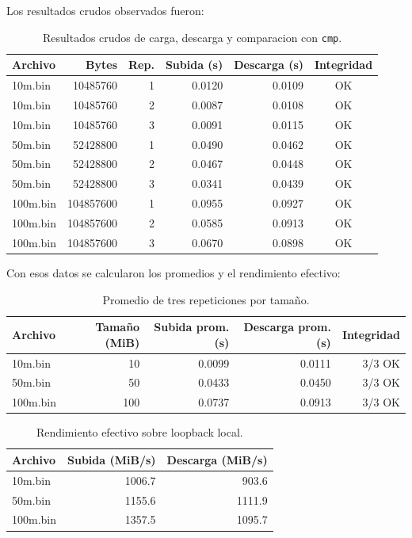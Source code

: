 \documentclass[12pt,letterpaper]{article}
\begin{document}
Los resultados crudos observados fueron:

\begin{table}[H]
\centering
\small
\begin{tabular}{lrrrrc}
\toprule
Archivo & Bytes & Rep. & Subida (s) & Descarga (s) & Integridad \\
\midrule
10m.bin & 10485760 & 1 & 0.0120 & 0.0109 & OK \\
10m.bin & 10485760 & 2 & 0.0087 & 0.0108 & OK \\
10m.bin & 10485760 & 3 & 0.0091 & 0.0115 & OK \\
50m.bin & 52428800 & 1 & 0.0490 & 0.0462 & OK \\
50m.bin & 52428800 & 2 & 0.0467 & 0.0448 & OK \\
50m.bin & 52428800 & 3 & 0.0341 & 0.0439 & OK \\
100m.bin & 104857600 & 1 & 0.0955 & 0.0927 & OK \\
100m.bin & 104857600 & 2 & 0.0585 & 0.0913 & OK \\
100m.bin & 104857600 & 3 & 0.0670 & 0.0898 & OK \\
\bottomrule
\end{tabular}
\caption{Resultados crudos de carga, descarga y comparacion con \texttt{cmp}.}
\end{table}

Con esos datos se calcularon los promedios y el rendimiento efectivo:

\begin{table}[H]
\centering
\begin{tabular}{lrrrr}
\toprule
Archivo & Tama\~{n}o (MiB) & Subida prom. (s) & Descarga prom. (s) & Integridad \\
\midrule
10m.bin & 10 & 0.0099 & 0.0111 & 3/3 OK \\
50m.bin & 50 & 0.0433 & 0.0450 & 3/3 OK \\
100m.bin & 100 & 0.0737 & 0.0913 & 3/3 OK \\
\bottomrule
\end{tabular}
\caption{Promedio de tres repeticiones por tama\~{n}o.}
\end{table}

\begin{table}[H]
\centering
\begin{tabular}{lrr}
\toprule
Archivo & Subida (MiB/s) & Descarga (MiB/s) \\
\midrule
10m.bin & 1006.7 & 903.6 \\
50m.bin & 1155.6 & 1111.9 \\
100m.bin & 1357.5 & 1095.7 \\
\bottomrule
\end{tabular}
\caption{Rendimiento efectivo sobre loopback local.}
\end{table}
\end{document}
